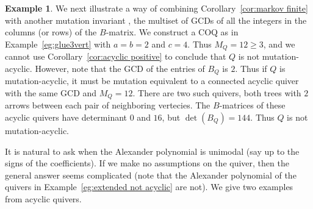 \documentclass[11pt, letterpaper]{amsart}
\newcommand{\hide}[1]{}
\theoremstyle{definition}
\newtheorem{remark}[theorem]{Remark}
\newtheorem{example}[theorem]{Example}
\numberwithin{equation}{section}
\begin{document}
\hide{ %
\begin{remark}
The COQ $Q$ constructed in Example~\ref{eg:glue3vert} can be constructed in another way. 
Start with any $3$-vertex quiver $Q'$; create a copy with all arrows reversed; pick an arrow $v \rightarrow w$ in $Q'$ and identify $v$ in $Q'$ with $w$ in the copy, and likewise $w$ in $Q'$ with $v$ in the copy.
In general, whenever we have two quivers with a common subquiver we can identify that common subquiver to create a larger quiver.
The Markov invariant of the resulting quiver will contain all the terms from both their respective Markov invariants.
Generally giving fairly simple inequalities for when the result must not be mutation-acyclic.
\end{remark}
} %

\begin{example}
\label{eg:glueeven}
We next illustrate a way of combining Corollary~\ref{cor:markov finite} with another mutation invariant \cite{Seven3x3}, the multiset of GCDs of all the integers in the columns (or rows) of the $B$-matrix. 
We construct a COQ as in Example~\ref{eg:glue3vert} with $a=b=2$ and $c=4$.
Thus $M_{Q} = 12 \geq 3$, and we cannot use Corollary~\ref{cor:acyclic positive} to conclude that $Q$ is not mutation-acyclic.
However, note that the GCD of the entries of $B_Q$ is $2$.
Thus if $Q$ is mutation-acyclic, it must be mutation equivalent to a connected acyclic quiver with the same GCD and $M_Q=12$.
There are two such quivers, both trees with $2$ arrows between each pair of neighboring vertecies.
The $B$-matrices of these acyclic quivers have determinant $0$ and $16$, but $\det(B_Q)=144$. %
Thus $Q$ is not mutation-acyclic.
\end{example}



It is natural to ask when the Alexander polynomial is unimodal (say up to the signs of the coefficients).
If we make no assumptions on the quiver, then the general answer seems complicated (note that the Alexander polynomial of the quivers in Example~\ref{eg:extended not acyclic} are not).
We give two examples from acyclic quivers. %
\end{document}

